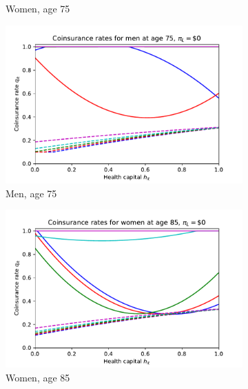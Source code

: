 \documentclass[12pt,pdftex,letterpaper]{article}
\begin{document}
\begin{figure}[h!]
\begin{subfigure}[b]{0.49\textwidth}
        \caption{Women, age 75}
    \end{subfigure}
    \begin{subfigure}[b]{0.49\textwidth}
        \centering
        \includegraphics[width=\textwidth]{../Figures/SocOpt00CopayMen75.pdf}
        \caption{Men, age 75}
    \end{subfigure}
    \begin{subfigure}[b]{0.49\textwidth}
        \centering
        \includegraphics[width=\textwidth]{../Figures/SocOpt00CopayWomen85.pdf}
        \caption{Women, age 85}
    \end{subfigure}
    \begin{subfigure}[b]{0.49\textwidth}
        \centering

\end{subfigure}
\end{figure}
\end{document}
